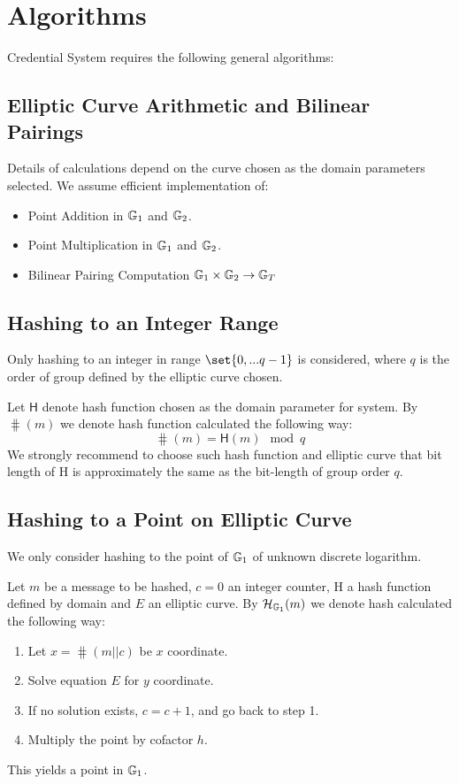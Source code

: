 \section{Algorithms}
Credential System requires the following general algorithms:

\subsection*{Elliptic Curve Arithmetic and Bilinear Pairings}
Details of calculations depend on the curve chosen as the domain parameters selected. We assume efficient implementation of:
\begin{itemize}[label=$\circ$]
    \item Point Addition in $\mathbb{G}_1$ and $\mathbb{G}_2$.
    \item Point Multiplication in $\mathbb{G}_1$ and $\mathbb{G}_2$.
    \item Bilinear Pairing Computation $\mathbb{G}_1 \times \mathbb{G}_2 \rightarrow \mathbb{G}_T$
\end{itemize}

\subsection*{Hashing to an Integer Range}
Only hashing to an integer in range $\set{0, ...q-1}$ is considered, where $q$ is the order of group defined by the elliptic curve chosen.

Let $\textsf{H}$ denote hash function chosen as the domain parameter for system. 
By $\hash(m)$ we denote hash function calculated the following way:
$$ \hash(m) = \textsf{H}(m) \mod q $$
We strongly recommend to choose such hash function and elliptic curve that bit length of \textsf{H} is approximately the same as the bit-length of group order $q$.

\subsection*{Hashing to a Point on Elliptic Curve}
We only consider hashing to the point of $\mathbb{G}_1$ of unknown discrete logarithm.

Let $m$ be a message to be hashed, $c = 0$ an integer counter, \textsf{H} a hash function defined by domain and $E$ an elliptic curve. By $\mathcal{H}_{\mathbb{G}_1}(m)$ we denote hash calculated the following way:
\begin{enumerate}
    \item Let $x = \hash(m || c)$ be $x$ coordinate.
    
    \item Solve equation $E$ for $y$ coordinate.
    
    \item If no solution exists, $c = c + 1$, and go back to step 1.
    
    \item Multiply the point by cofactor $h$.
\end{enumerate}
This yields a point in $\mathbb{G}_1$.





